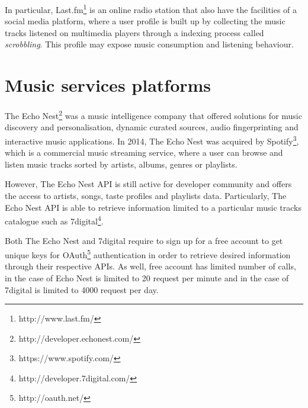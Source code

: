 In particular, Last.fm\footnote{http://www.last.fm/} is an online radio station that also have the facilities of a social media platform, where a user profile is built up by collecting the music tracks listened on multimedia players through a indexing process called \emph{scrobbling}. This profile may expose music consumption and listening behaviour. \parencite{Putzke2014519}

\section{Music services platforms}
\label{sec:musicservices}
The Echo Nest\footnote{http://developer.echonest.com/} was a music intelligence company that offered solutions for music discovery and personalisation, dynamic curated sources, audio fingerprinting and interactive music applications. In 2014, The Echo Nest was acquired by Spotify\footnote{https://www.spotify.com/}, which is a commercial music streaming service, where a user can browse and listen music tracks sorted by artists, albums, genres or playlists. 

However, The Echo Nest API is still active for developer community and offers the access to artists, songs, taste profiles and playlists data. Particularly, The Echo Nest API is able to retrieve information limited to a particular music tracks catalogue such as 7digital\footnote{http://developer.7digital.com/}.

Both The Echo Nest and 7digital require to sign up for a free account to get unique keys for OAuth\footnote{http://oauth.net/} authentication in order to retrieve desired information through their respective APIs. As well, free account has limited number of calls, in the case of Echo Nest is limited to 20 request per minute and in the case of 7digital is limited to 4000 request per day.

